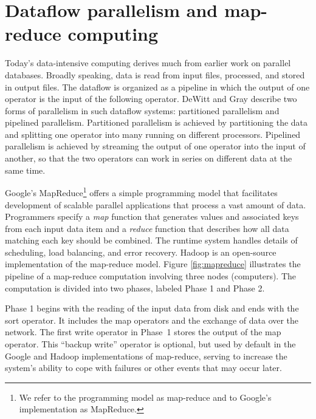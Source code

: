
\section{Dataflow parallelism and map-reduce computing}
\label{sec:background}

Today's data-intensive computing derives much from earlier work on
parallel databases.  Broadly speaking, data is read from input files,
processed, and stored in output files.  The dataflow is organized as a
pipeline in which the output of one operator is the input of the
following operator.  DeWitt and Gray \cite{paralleldatabases} describe
two forms of parallelism in such dataflow systems: partitioned
parallelism and pipelined parallelism.  Partitioned parallelism is
achieved by partitioning the data and splitting one operator into many
running on different processors.  Pipelined parallelism is achieved by
streaming the output of one operator into the input of another, so
that the two operators can work in series on different data at the
same time.

Google's MapReduce\footnote{We refer to the programming model as map-reduce
and to Google's implementation as MapReduce.} \cite{mapreduce} offers a
simple programming model that facilitates development of scalable parallel
applications that process a vast amount of data.
Programmers specify a {\it map} function that generates values and
associated keys from each input data item and a {\it reduce} function
that describes how all data matching each key should be combined.
The runtime system handles details of scheduling, load balancing, and
error recovery.
Hadoop \cite{hadoop} is an open-source implementation of the map-reduce model.
Figure \ref{fig:mapreduce} illustrates the pipeline of a map-reduce
computation involving three nodes (computers).
The computation is divided into two phases, labeled Phase 1 and Phase 2.



Phase 1 begins with the reading of the input data from disk and ends with the
sort operator. It includes the map operators and the exchange of data over the
network.
The first write operator in Phase~1 stores the output of the map operator.
This ``backup write'' operator is optional, but used by default in the
Google and Hadoop implementations of map-reduce, serving to increase the
system's ability to cope with failures or other events that may occur later.

